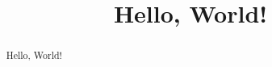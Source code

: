 \documentclass{article}
\title{Hello, World!}
\author{}
\date{}
\begin{document}
\maketitle

\begin{abstract}
    Hello, World!
\end{abstract}

\tableofcontents


\printbibliography[heading=bibnumbered] %
\end{document}
